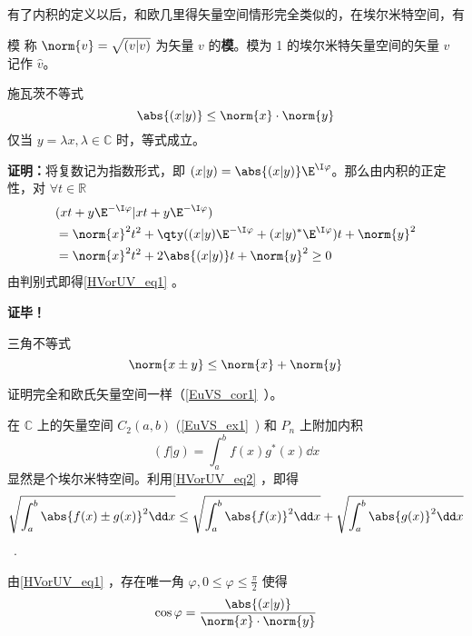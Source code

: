 有了内积的定义以后，和欧几里得矢量空间情形完全类似的，在埃尔米特空间，有
\begin{definition}{模}
称 $\norm{  v}=\sqrt{(  v|  v)}$ 为矢量 $  v$ 的\textbf{模}。模为 1 的埃尔米特矢量空间的矢量 $v$ 记作 $\hat{v}$。
\end{definition} 
\begin{theorem}{施瓦茨不等式}
\begin{equation}\label{HVorUV_eq1}
\abs{(  x|  y)}\leq \norm{  x}\cdot \norm{  y}
\end{equation}
仅当 $  y=\lambda  x,\lambda\in\mathbb{C}$ 时，等式成立。
\end{theorem}
\textbf{证明：}将复数记为指数形式，即 $(  x|  y)=\abs{(  x|  y)}\E^{\I \varphi}$。那么由内积的正定性，对 $\forall t\in\mathbb{R}$
\begin{equation}
\begin{aligned}
&(  x t+  y\E^{-\I\varphi}|  x t+  y\E^{-\I\varphi})\\
&=\norm{  x}^2t^2+\qty((  x|  y)\E^{-\I\varphi}+(  x|  y)^*\E^{\I\varphi})t+\norm{  y}^2\\
&=\norm{  x}^2t^2+2\abs{(  x|  y)}t+\norm{  y}^2\geq0
\end{aligned}
\end{equation}
由判别式即得\autoref{HVorUV_eq1} 。

\textbf{证毕！}
\begin{corollary}{三角不等式}
\begin{equation}\label{HVorUV_eq2}
\norm{  x\pm  y}\leq\norm{  x}+\norm{  y}
\end{equation}
\end{corollary}
证明完全和欧氏矢量空间一样（\autoref{EuVS_cor1}~）。
\begin{example}{}\label{HVorUV_ex1}
在 $\mathbb{C}$ 上的矢量空间 $C_2(a,b)$ (\autoref{EuVS_ex1}~) 和 $P_n$ 上附加内积
\begin{equation}
(f|g)=\int_a^{b}f(x)g^*(x)\dd x
\end{equation}
显然是个埃尔米特空间。利用\autoref{HVorUV_eq2} ，即得
\begin{equation}
\sqrt{\int_a^b\abs{f(x)\pm g(x)}^2\dd x}\leq\sqrt{\int_a^b\abs{f(x)}^2\dd x}+\sqrt{\int_a^b\abs{g(x)}^2\dd x}
\end{equation}~.
\end{example}
由\autoref{HVorUV_eq1} ，存在唯一角 $\varphi,0\leq\varphi\leq\frac{\pi}{2}$ 使得
\begin{equation}
\cos\varphi=\frac{\abs{(  x|  y)}}{\norm{  x}\cdot \norm{  y}}
\end{equation}
